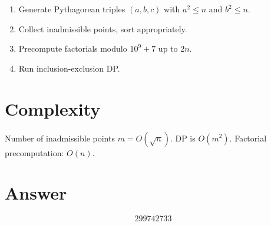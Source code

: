\documentclass[11pt]{article}
\begin{document}
\begin{enumerate}
  \item Generate Pythagorean triples $(a, b, c)$ with $a^2 \le n$ and $b^2 \le n$.
  \item Collect inadmissible points, sort appropriately.
  \item Precompute factorials modulo $10^9 + 7$ up to $2n$.
  \item Run inclusion-exclusion DP.
\end{enumerate}

\section{Complexity}

Number of inadmissible points $m = O(\sqrt{n})$. DP is $O(m^2)$.
Factorial precomputation: $O(n)$.

\section{Answer}

\[
\boxed{299742733}
\]
\end{document}
